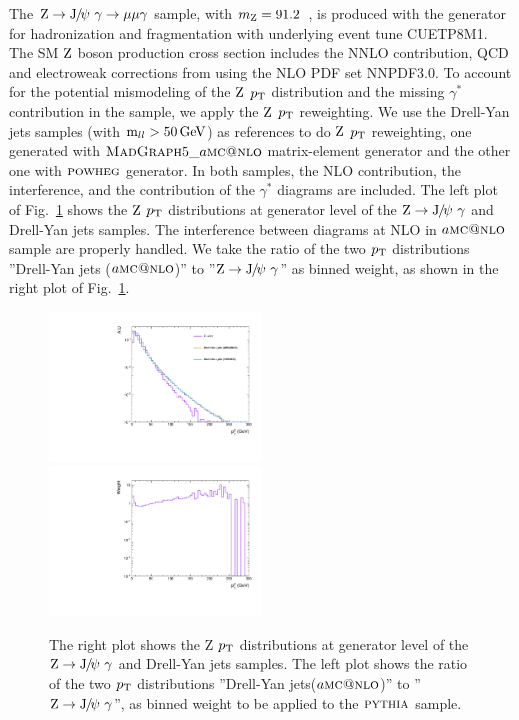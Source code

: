 		The $\cPZ\to\JPsi\ \gamma\to\mu\mu\gamma$ sample, with $m_{\mathrm{Z}}=91.2$\GeV~\cite{Patrignani:2241948}, is produced with the  generator for hadronization and fragmentation with underlying event tune CUETP8M1.
The SM $\mathrm{Z}$ boson production cross section includes the NNLO contribution, QCD and electroweak corrections from  using the NLO PDF set NNPDF3.0.
		To account for the potential mismodeling of the $\mathrm{Z}$ $p_{\mathrm{T}}$ distribution and the missing $\gamma^{*}$ contribution in the sample, we apply the $\mathrm{Z}$ $p_{\mathrm{T}}$ reweighting. 
		We use the Drell-Yan jets samples (with $\text{m}_{ll} > 50\,\text{Ge\hspace{-.08em}V}$) as references to do $\mathrm{Z}$ $p_{\mathrm{T}}$ reweighting, one generated with $\textsc{MadGraph}{}5\_a\textsc{mc@nlo}$ matrix-element generator and the other one with ${\textsc{powheg}}$ generator. In both samples, the NLO contribution, the interference, and the contribution of the $\gamma^{*}$ diagrams are included. 
		The left plot of Fig.~\ref{fig:ZPtRewei} shows the $\mathrm{Z}$ $p_{\mathrm{T}}$ distributions at generator level of the $\mathrm{Z}\to{\mathrm{J}\hspace{-.08em}/\hspace{-.14em}\psi}\ \gamma$ and Drell-Yan jets samples. The interference between diagrams at NLO in $a\textsc{mc@nlo}$ sample are properly handled.  
		We take the ratio of the two $p_{\mathrm{T}}$ distributions ''Drell-Yan jets ($a\textsc{mc@nlo}$)'' to ''$\mathrm{Z}\to{\mathrm{J}\hspace{-.08em}/\hspace{-.14em}\psi}\ \gamma$'' as binned weight, as shown in the right plot of Fig.~\ref{fig:ZPtRewei}.
		\begin{figure}[!ht]
		  \begin{center}
		  \includegraphics[width=0.5\textwidth]{Fig/ZPt_comp_withgenwei_final}~
		  \includegraphics[width=0.5\textwidth]{Fig/ZPt_ratio_withgenwei_final}\\
		  \caption{The right plot shows the Z $p_{\mathrm{T}}$ distributions at generator level of the $\mathrm{Z}\to{\mathrm{J}\hspace{-.08em}/\hspace{-.14em}\psi}\ \gamma$ and Drell-Yan jets samples. The left plot shows the ratio of the two $p_{\mathrm{T}}$ distributions ''Drell-Yan jets($a\textsc{mc@nlo}$)'' to ''$\mathrm{Z}\to{\mathrm{J}\hspace{-.08em}/\hspace{-.14em}\psi}\ \gamma$'', as binned weight to be applied to the ${\textsc{pythia}}$ sample. \label{fig:ZPtRewei}}
		  \end{center}
		\end{figure}
		
